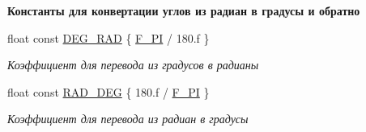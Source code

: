 \begin{Indent}\textbf{ Константы для конвертации углов из радиан в градусы и обратно}\par
\begin{DoxyCompactItemize}
\item 
\mbox{\label{namespacertm_a797faf3037681ed7bc153db9eca6155e}} 
float const \hyperlink{namespacertm_a797faf3037681ed7bc153db9eca6155e}{D\+E\+G\+\_\+\+R\+AD} \{ \hyperlink{namespacertm_ae15880ada663d5427ba0d78437ee5c26}{F\+\_\+\+PI} / 180.f \}
\begin{DoxyCompactList}\small\item\em Коэффициент для перевода из градусов в радианы \end{DoxyCompactList}\item 
\mbox{\label{namespacertm_ad7147b92a6d3ba6f4b7e8d2f3e73153b}} 
float const \hyperlink{namespacertm_ad7147b92a6d3ba6f4b7e8d2f3e73153b}{R\+A\+D\+\_\+\+D\+EG} \{ 180.f / \hyperlink{namespacertm_ae15880ada663d5427ba0d78437ee5c26}{F\+\_\+\+PI} \}
\begin{DoxyCompactList}\small\item\em Коэффициент для перевода из радиан в градусы \end{DoxyCompactList}\end{DoxyCompactItemize}
\end{Indent}

